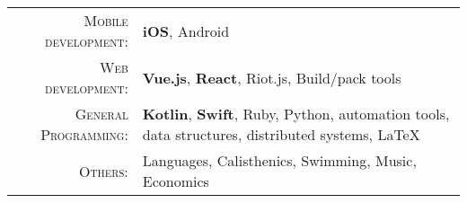 %
%
%

\begin{tabular}{rl}
    \textsc{Mobile development:} & \textbf{iOS}, Android \\
    \textsc{Web development:} & \textbf{Vue.js}, \textbf{React}, Riot.js, Build/pack tools \\ 
    \textsc{General Programming:} & \textbf{Kotlin}, \textbf{Swift}, Ruby, Python, automation tools, data structures, distributed systems, LaTeX \\ 
    \textsc{Others:} & Languages, Calisthenics, Swimming, Music, Economics \\
\end{tabular}
